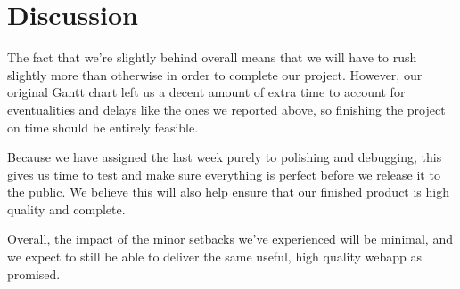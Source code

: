 \section{Discussion}

The fact that we're slightly behind overall means that we will have to rush
slightly more than otherwise in order to complete our project. However, our
original Gantt chart left us a decent amount of extra time to account for
eventualities and delays like the ones we reported above, so finishing the
project on time should be entirely feasible.

Because we have assigned the last week purely to polishing and debugging, 
this gives us time to test and make sure everything is perfect before we 
release it to the public. We believe this will also help ensure that our
finished product is high quality and complete.

Overall, the impact of the minor setbacks we've experienced will be minimal,
and we expect to still be able to deliver the same useful, high quality
webapp as promised.
